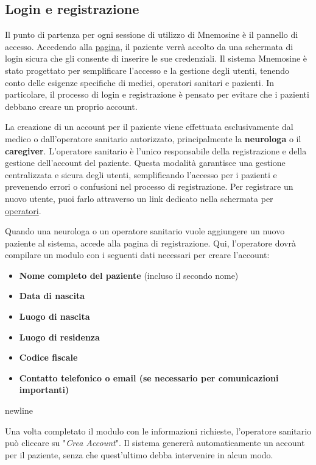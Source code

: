 \documentclass[a4paper,12pt]{book}
\begin{document}
	\subsection{Login e registrazione}
	Il punto di partenza per ogni sessione di utilizzo di Mnemosine è il pannello di accesso. Accedendo alla \href{https://mnemosinefe.it/login}{pagina}, il paziente verrà accolto da una schermata di login sicura che gli consente di inserire le sue credenziali. Il sistema Mnemosine è stato progettato per semplificare l'accesso e la gestione degli utenti, tenendo conto delle esigenze specifiche di medici, operatori sanitari e pazienti. In particolare, il processo di login e registrazione è pensato per evitare che i pazienti debbano creare un proprio account.
	
	La creazione di un account per il paziente viene effettuata esclusivamente dal medico o dall'operatore sanitario autorizzato, principalmente la \textbf{neurologa} o il \textbf{caregiver}. L'operatore sanitario è l'unico responsabile della registrazione e della gestione dell'account del paziente. Questa modalità garantisce una gestione centralizzata e sicura degli utenti, semplificando l'accesso per i pazienti e prevenendo errori o confusioni nel processo di registrazione. Per registrare un nuovo utente, puoi farlo attraverso un link dedicato nella schermata per \href{https://mnemosinefe.it/admin/login}{operatori}.

	Quando una neurologa o un operatore sanitario vuole aggiungere un nuovo paziente al sistema, accede alla pagina di registrazione. Qui, l'operatore dovrà compilare un modulo con i seguenti dati necessari per creare l'account:
	\begin{itemize}
		\item \textbf{Nome completo del paziente} (incluso il secondo nome)
		\item \textbf{Data di nascita}
		\item \textbf{Luogo di nascita}
		\item \textbf{Luogo di residenza}
		\item \textbf{Codice fiscale}
		\item \textbf{Contatto telefonico o email (se necessario per comunicazioni importanti)}
	\end{itemize}newline
	
	Una volta completato il modulo con le informazioni richieste, l'operatore sanitario può cliccare su "\textit{Crea Account}". Il sistema genererà automaticamente un account per il paziente, senza che quest'ultimo debba intervenire in alcun modo.
	
\end{document}
